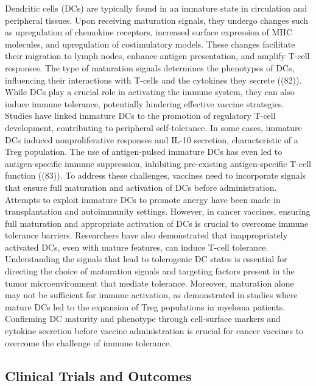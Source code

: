 \documentclass[
]{article}
\begin{document}
Dendritic cells (DCs) are typically found in an immature state in
circulation and peripheral tissues. Upon receiving maturation signals,
they undergo changes such as upregulation of chemokine receptors,
increased surface expression of MHC molecules, and upregulation of
costimulatory models. These changes facilitate their migration to lymph
nodes, enhance antigen presentation, and amplify T-cell responses. The
type of maturation signals determines the phenotypes of DCs, influencing
their interactions with T-cells and the cytokines they secrete ((82)).
While DCs play a crucial role in activating the immune system, they can
also induce immune tolerance, potentially hindering effective vaccine
strategies. Studies have linked immature DCs to the promotion of
regulatory T-cell development, contributing to peripheral
self-tolerance. In some cases, immature DCs induced nonproliferative
responses and IL-10 secretion, characteristic of a Treg population. The
use of antigen-pulsed immature DCs has even led to antigen-specific
immune suppression, inhibiting pre-existing antigen-specific T-cell
function ((83)). To address these challenges, vaccines need to
incorporate signals that ensure full maturation and activation of DCs
before administration. Attempts to exploit immature DCs to promote
anergy have been made in transplantation and autoimmunity settings.
However, in cancer vaccines, ensuring full maturation and appropriate
activation of DCs is crucial to overcome immune tolerance barriers.
Researchers have also demonstrated that inappropriately activated DCs,
even with mature features, can induce T-cell tolerance. Understanding
the signals that lead to tolerogenic DC states is essential for
directing the choice of maturation signals and targeting factors present
in the tumor microenvironment that mediate tolerance. Moreover,
maturation alone may not be sufficient for immune activation, as
demonstrated in studies where mature DCs led to the expansion of Treg
populations in myeloma patients. Confirming DC maturity and phenotype
through cell-surface markers and cytokine secretion before vaccine
administration is crucial for cancer vaccines to overcome the challenge
of immune tolerance.

\subsection{Clinical Trials and
Outcomes}\label{clinical-trials-and-outcomes}
\end{document}
